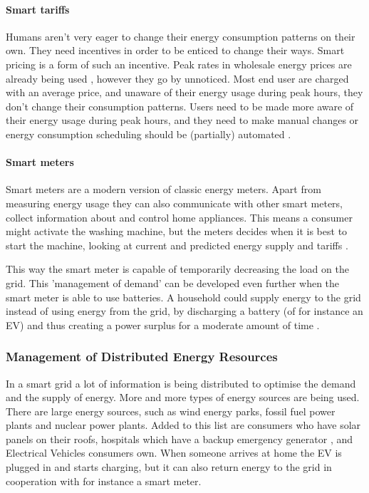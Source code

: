 \paragraph{Smart tariffs}

Humans aren’t very eager to change their energy consumption patterns on their own. They need incentives in order to be enticed to change their ways. Smart pricing is a form of such an incentive. Peak rates in wholesale energy prices are already being used \cite{SamadiMohsenian-RadSchoberEtAl2012}, however they go by unnoticed. Most end user are charged with an average price, and unaware of their energy usage during peak hours, they don’t change their consumption patterns. Users need to be made more aware of their energy usage during peak hours, and they need to make manual changes \cite{Mohsenian-RadLeon-Garcia2010} or energy consumption scheduling should be (partially) automated  \cite{SamadiMohsenian-RadSchoberEtAl2012}.

\paragraph{Smart meters}

Smart meters are a modern version of classic energy meters. Apart from measuring energy usage they can also communicate with other smart meters, collect information about and control home appliances. This means a consumer might activate the washing machine, but the meters decides when it is best to start the machine, looking at current and predicted energy supply and tariffs  \cite{DepuruWangDevabhaktuni2011a}. 

This way the smart meter is capable of temporarily decreasing the load on the grid. This 'management of demand' can be developed even further when the smart meter is able to use batteries. A household could supply energy to the grid instead of using energy from the grid, by discharging a battery (of for instance an EV) and thus creating a power surplus for a moderate amount of time \cite{MwasiluJustoKimEtAl2014}. 

\subsubsection{Management of Distributed Energy Resources}
In a smart grid a lot of information is being distributed to optimise the demand and the supply of energy. More and more types of energy sources are being used. There are large energy sources, such as wind energy parks, fossil fuel power plants and nuclear power plants. Added to this list are consumers who have solar panels on their roofs, hospitals which have a backup emergency generator \cite{Kumagai2012}, and Electrical Vehicles consumers own. When someone arrives at home the EV is plugged in and starts charging, but it can also return energy to the grid in cooperation with for instance a smart meter.

